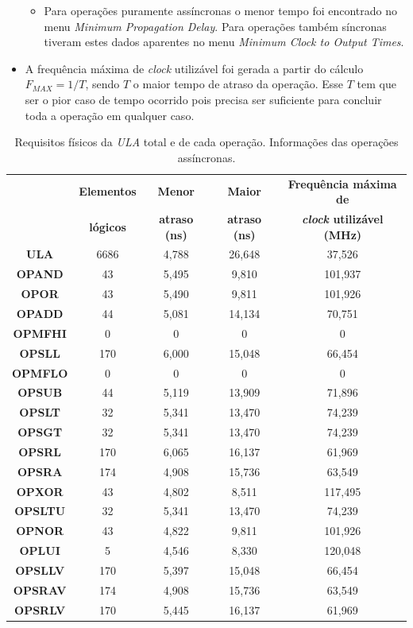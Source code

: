 \documentclass[12pt]{article}
\begin{document}
\begin{itemize}
\begin{itemize}
			\item Para operações puramente assíncronas o menor tempo foi encontrado no menu \textit{Minimum Propagation Delay}. Para operações também síncronas tiveram estes dados aparentes no menu \textit{Minimum Clock to Output Times}. 
		\end{itemize}
	\item A frequência máxima de \textit{clock} utilizável foi gerada a partir do cálculo $F_{MAX} = 1/T$, sendo $T$ o maior tempo de atraso da operação. Esse $T$ tem que ser o pior caso de tempo ocorrido pois precisa ser suficiente para concluir toda a operação em qualquer caso.
\end{itemize}

\begin{table}[H]
	\centering
	\begin{tabular}{|c|c|c|c|c|}
		\hline
		& \textbf{Elementos} & \textbf{Menor} & \textbf{Maior} & \textbf{Frequência máxima de} \\
		& \textbf{lógicos} & \textbf{atraso (ns)} &  \textbf{atraso (ns)} & \textbf{\textit{clock} utilizável (MHz)} \\
		\hline
		\textbf{ULA} & 6686 & 4,788 & 26,648 & 37,526 \\\hline
		\textbf{OPAND} & 43 & 5,495 & 9,810 & 101,937 \\\hline
		\textbf{OPOR} & 43 & 5,490 & 9,811 & 101,926 \\\hline
		\textbf{OPADD} & 44 & 5,081 & 14,134 & 70,751 \\\hline
		\textbf{OPMFHI} & 0 & 0 & 0 & 0 \\\hline
		\textbf{OPSLL} & 170 & 6,000 & 15,048 & 66,454 \\\hline
		\textbf{OPMFLO} & 0 & 0 & 0 & 0 \\\hline
		\textbf{OPSUB} & 44 & 5,119 & 13,909 & 71,896 \\\hline
		\textbf{OPSLT} & 32 & 5,341 & 13,470 & 74,239 \\\hline
		\textbf{OPSGT} & 32 & 5,341 & 13,470 & 74,239 \\\hline
		\textbf{OPSRL} & 170 & 6,065 & 16,137 & 61,969 \\\hline
		\textbf{OPSRA} & 174 & 4,908 & 15,736 & 63,549 \\\hline
		\textbf{OPXOR} & 43 & 4,802 & 8,511 & 117,495 \\\hline
		\textbf{OPSLTU} & 32 & 5,341 & 13,470 & 74,239 \\\hline
		\textbf{OPNOR} & 43 & 4,822 & 9,811 & 101,926 \\\hline
		\textbf{OPLUI} & 5 & 4,546 & 8,330 & 120,048 \\\hline
		\textbf{OPSLLV} & 170 & 5,397 & 15,048 & 66,454 \\\hline
		\textbf{OPSRAV} & 174 & 4,908 & 15,736 & 63,549 \\\hline
		\textbf{OPSRLV} & 170 & 5,445 & 16,137 & 61,969 \\\hline
	\end{tabular}
	\caption{Requisitos físicos da \textit{ULA} total e de cada operação. Informações das operações assíncronas.}
	\label{tab:req21}
\end{table}
\end{document}

